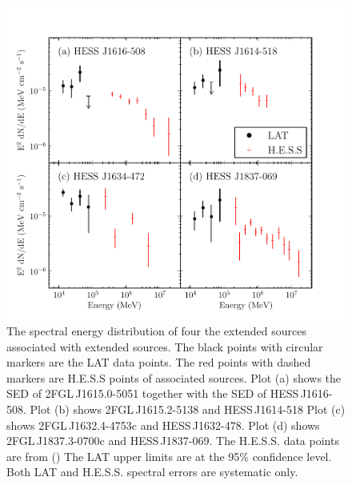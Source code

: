 \documentclass[12pt,preprint]{aastex}
\newcommand{\gev}{\text{GeV}\xspace}
\newcommand{\tev}{\text{TeV}\xspace}
\begin{document}
\clearpage
\begin{figure}
  \begin{center}
    \includegraphics{summary_plots/hess_seds.pdf}
    \end{center}
    \caption{
    The spectral energy distribution of four the extended sources
    associated with extended \tev sources.  The black points with circular
    markers are the LAT data points. The red points with dashed markers
    are H.E.S.S points of associated sources.  Plot (a) shows the \gev
    SED of 2FGL\,J1615.0-5051 together with the \tev SED of HESS\,J1616-508.
    Plot (b) shows 2FGL\,J1615.2-5138 and HESS\,J1614-518 Plot (c)
    shows 2FGL\,J1632.4-4753c and HESS\,J1632-478. Plot (d) shows
    2FGL\,J1837.3-0700c and HESS\,J1837-069. The H.E.S.S. data points
    are from (\cite{hess_plane_survey}) The LAT upper limits are at the
    95\% confidence level.  Both LAT and H.E.S.S. spectral errors are
    systematic only.
    }
    \label{hess_seds}
  \end{figure}
\end{document}
